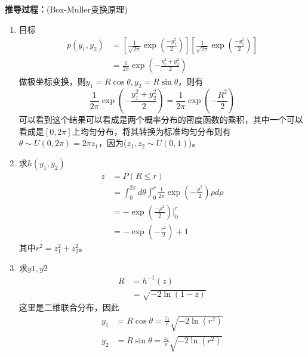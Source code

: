 \textbf{推导过程：}(Box-Muller变换原理)
\begin{enumerate}
	\item 目标
	\begin{equation}
	\begin{aligned}
		p(y_1,y_2)&=\left[\frac{1}{\sqrt{2\pi}}\exp \left(\frac{-y_1^2}{2} \right) \right]\left[\frac{1}{\sqrt{2\pi}}\exp \left(\frac{-y_1^2}{2}\right) \right]\\
		&=\frac{1}{2\pi}\exp \left(-\frac{y_1^2+y_2^2}{2} \right)
	\end{aligned}
	\end{equation}
	做极坐标变换，则$y_1=R\cos \theta,y_2=R\sin \theta$，则有
	\begin{equation}
		\frac{1}{2\pi}\exp \left(-\frac{y_1^2+y_2^2}{2} \right)=\frac{1}{2\pi}\exp \left(-\frac{R^2}{2} \right)
	\end{equation}
	可以看到这个结果可以看成是两个概率分布的密度函数的乘积，其中一个可以看成是$[0,2\pi]$上均匀分布，将其转换为标准均匀分布则有$\theta \sim U(0,2\pi)=2\pi z_1$，因为($z_1,z_2\sim U(0,1)$)。
	\item 求$h(y_1,y_2)$
	\begin{equation}
		\begin{aligned}
			z&=P(R\leqslant r)\\
			 &=\int_0^{2\pi} d\theta\int_0^r \frac{1}{2\pi}\exp \left(-\frac{\rho^2}{2} \right)\rho d\rho\\
			 &=-\exp\left(\frac{-\rho^2}{2}\right)\bigg|_0^r \\
			 &=-\exp \left(-\frac{r^2}{2}\right)+1
		\end{aligned}
	\end{equation}
	其中$r^2=z_1^2+z_2^2$。
	\item 求$y1,y2$
	\begin{equation}
		\begin{aligned}
			R&=h^{-1}(z)\\
			&=\sqrt{-2\ln (1-z)}
		\end{aligned}
	\end{equation}
	这里是二维联合分布，因此
	\begin{equation}
		\begin{aligned}
			y_1&=R\cos \theta = \frac{z_1}{r} \sqrt{-2\ln (r^2)}\\
			y_2&=R\sin \theta = \frac{z_2}{r} \sqrt{-2\ln (r^2)}
		\end{aligned}
	\end{equation}
\end{enumerate}

